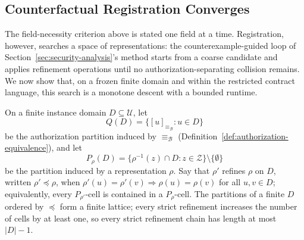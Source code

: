 
\subsection{Counterfactual Registration Converges}
\label{sec:registration-convergence}

The field-necessity criterion above is stated one field at a time. Registration,
however, searches a space of representations: the counterexample-guided loop of
Section~\ref{sec:security-analysis}'s method starts from a coarse candidate and
applies refinement operations until no authorization-separating collision
remains. We now show that, on a frozen finite domain and within the restricted
contract language, this search is a monotone descent with a bounded runtime.

\begin{definition}
\label{def:refinement-lattice}
On a finite instance domain $D\subseteq\mathcal{U}$, let
\[
  Q(D)=\bigl\{[u]_{\equiv_{\mathcal{B}}}:u\in D\bigr\}
\]
be the authorization partition induced by
$\equiv_{\mathcal{B}}$ (Definition~\ref{def:authorization-equivalence}), and
let
\[
  P_\rho(D)=\bigl\{\rho^{-1}(z)\cap D:z\in\mathcal{Z}\bigr\}\setminus\{\emptyset\}
\]
be the partition induced by a representation $\rho$. Say that $\rho'$ refines
$\rho$ on $D$, written $\rho'\preceq\rho$, when
$\rho'(u)=\rho'(v)\Rightarrow\rho(u)=\rho(v)$ for all $u,v\in D$; equivalently,
every $P_{\rho'}$-cell is contained in a $P_\rho$-cell. The partitions of a
finite $D$ ordered by $\preceq$ form a finite lattice; every strict refinement
increases the number of cells by at least one, so every strict refinement
chain has length at most $|D|-1$.
\end{definition}

